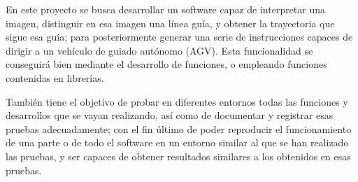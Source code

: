 
En este proyecto se busca desarrollar un software capaz de interpretar una imagen, distinguir en esa imagen una línea guía, y obtener la trayectoria que sigue esa guía; para posteriormente generar una serie de instrucciones capaces de dirigir a un vehículo de guiado autónomo (AGV).
Esta funcionalidad se conseguirá bien mediante el desarrollo de funciones, o empleando funciones contenidas en librerías.

También tiene el objetivo de probar en diferentes entornos todas las funciones y desarrollos que se vayan realizando, así como de documentar y registrar esas pruebas adecuadamente; con el fin último de poder reproducir el funcionamiento de una parte o de todo el software en un entorno similar al que se han realizado las pruebas, y ser capaces de obtener resultados similares a los obtenidos en esas pruebas.
